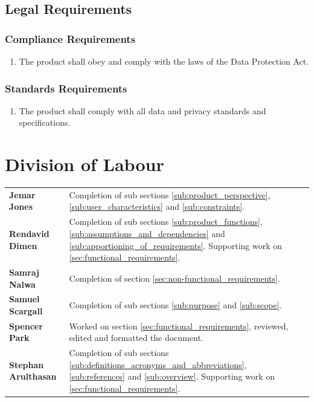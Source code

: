 \documentclass[]{article}
\newcounter{saveenum}
\newcommand{\pauseEnum}{\setcounter{saveenum}{\value{enumi}}}
\newcommand{\resumeEnum}{\setcounter{enumi}{\value{saveenum}}}
\begin{document}

\subsection{Legal Requirements}
\label{sub:legal_requirements}

\subsubsection{Compliance Requirements}
\label{ssub:compliance_requirements}
\begin{enumerate}[{LR}1. ]
	\item The product shall obey and comply with the laws of the Data Protection Act.
	\pauseEnum
\end{enumerate}

\subsubsection{Standards Requirements}
\label{ssub:standards_requirements}
\begin{enumerate}[{LR}1. ]
	\resumeEnum
	\item The product shall comply with all data and privacy standards and specifications.
	\pauseEnum
\end{enumerate}



\appendix

\newpage
\section{Division of Labour}
\label{sec:division_of_labour}
\noindent\begin{tabular}{l l}
	\textbf{Jemar Jones} & Completion of sub sections \ref{sub:product_perspective}, \ref{sub:user_characteristics} and \ref{sub:constraints}. \\
	\textbf{Rendavid Dimen} & Completion of sub sections \ref{sub:product_functions}, \ref{sub:assumptions_and_dependencies} and \ref{sub:apportioning_of_requirements}. Supporting work on \ref{sec:functional_requirements}.\\
	\textbf{Samraj Nalwa} & Completion of section \ref{sec:non-functional_requirements}. \\
	\textbf{Samuel Scargall} & Completion of sub sections \ref{sub:purpose} and \ref{sub:scope}. \\
	\textbf{Spencer Park} & Worked on section \ref{sec:functional_requirements}, reviewed, edited and formatted the document.\\
	\textbf{Stephan Arulthasan} & Completion of sub sections \ref{sub:definitions_acronyms_and_abbreviations}, \ref{sub:references} and \ref{sub:overview}. Supporting work on \ref{sec:functional_requirements}.\\
\end{tabular}
\\
\end{document}
